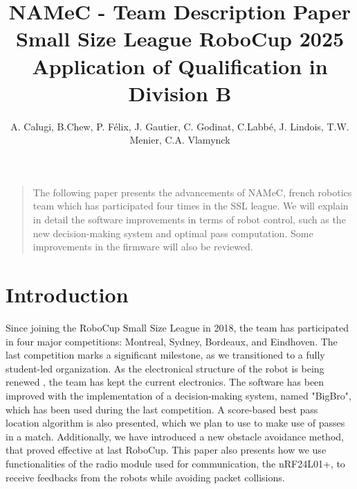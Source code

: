\title{
  NAMeC - Team Description Paper \\
  Small Size League RoboCup 2025 \\
  Application of Qualification in Division B
}


\author{
    A. Calugi, B.Chew, P. Félix, J. Gautier, C. Godinat,
    C.Labbé, J. Lindois, T.W. Menier, C.A. Vlamynck
}



\maketitle

\renewenvironment{abstract}
{\begin{quote}
\noindent \par{\bfseries \abstractname}}
{\medskip\noindent
\end{quote}
}

\begin{abstract}
The following paper presents the advancements of NAMeC, french robotics team 
which has participated four times in the SSL league. We will explain
in detail the software improvements in terms of robot control, such as the
new decision-making system and optimal pass computation. Some improvements in the
firmware will also be reviewed.
\end{abstract}


\section{Introduction}

Since joining the RoboCup Small Size League in 2018, the team has participated in four major competitions: Montreal, Sydney, Bordeaux, and Eindhoven.
The last competition marks a significant milestone, as we transitioned to a fully student-led organization.
As the electronical structure of the robot is being renewed \cite{tdp2023}, the team has kept the current electronics.
The software has been improved with the implementation of a decision-making system, named "BigBro", which has been
used during the last competition. A score-based best pass location algorithm is also presented, which we plan to use
to make use of passes in a match. Additionally, we have introduced a new obstacle avoidance method,
that proved effective at last RoboCup. This paper also presents how we use functionalities of the radio module
used for communication, the nRF24L01+, to receive feedbacks from the robots while avoiding packet collisions.